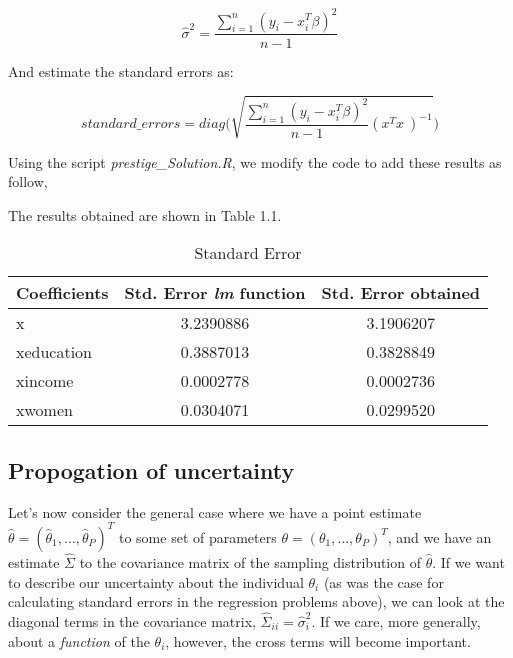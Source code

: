 \documentclass[twoside]{article}
\begin{document}
$$ \hat{\sigma}^2 = \frac{\sum_{i=1}^{n} (y_i - x_i^T\beta)^2}{n-1} $$

And estimate the standard errors as:

$$ standard\_errors  = diag \bigg( \sqrt{\frac{\sum_{i=1}^{n} (y_i - x_i^T\beta)^2}{n-1} (x^Tx\ )^{-1}  } \bigg)$$

Using the script \textit{prestige\_Solution.R}, we modify the code to add these results as follow,

\color{black}


\color{blue}

The results obtained are shown in Table 1.1.


\begin{table}[H]
	\centering
	\caption{Standard Error}
	\label{my-label}
	\begin{tabular}{|l|c|c|}
		\hline
		\multicolumn{1}{|c|}{\textbf{Coefficients}} & \textbf{Std. Error \textit{lm} function} & \textbf{Std. Error obtained} \\ \hline
		x                                           & 3.2390886                       & 3.1906207                    \\ \hline
		xeducation                                  & 0.3887013                       & 0.3828849                    \\ \hline
		xincome                                     & 0.0002778                       & 0.0002736                    \\ \hline
		xwomen                                      & 0.0304071                       & 0.0299520                    \\ \hline
	\end{tabular}
\end{table}


\color{black}


\subsection{Propogation of uncertainty}
Let's now consider the general case where we have a point estimate $\hat{\theta} = (\hat{\theta}_1,\dots, \hat{\theta}_P)^T$ to some set of parameters $\theta = (\theta_1,\dots,\theta_P)^T$, and we have an estimate $\hat{\Sigma}$ to the covariance matrix of the sampling distribution of $\hat{\theta}$. If we want to describe our uncertainty about the individual $\theta_i$ (as was the case for calculating standard errors in the regression problems above), we can look at the diagonal terms in the covariance matrix, $\hat{\Sigma}_{ii} = \hat{\sigma}_i^2$. If we care, more generally, about a \textit{function} of the $\theta_i$, however, the cross terms will become important.
\end{document}
